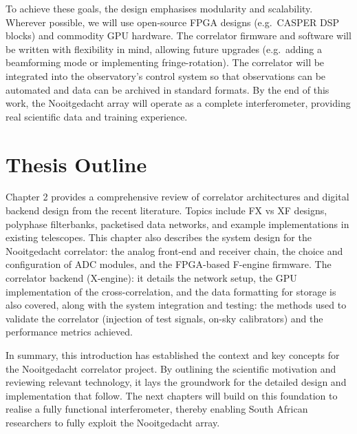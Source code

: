     To achieve these goals, the design emphasises modularity and scalability. Wherever possible, we will use open-source FPGA designs (e.g.\ CASPER DSP blocks) and commodity GPU hardware. The correlator firmware and software will be written with flexibility in mind, allowing future upgrades (e.g.\ adding a beamforming mode or implementing fringe-rotation). The correlator will be integrated into the observatory’s control system so that observations can be automated and data can be archived in standard formats. By the end of this work, the Nooitgedacht array will operate as a complete interferometer, providing real scientific data and training experience.
    
    \section{Thesis Outline}
    Chapter 2 provides a comprehensive review of correlator architectures and digital backend design from the recent literature. Topics include FX vs XF designs, polyphase filterbanks, packetised data networks, and example implementations in existing telescopes. This chapter also describes the system design for the Nooitgedacht correlator: the analog front-end and receiver chain, the choice and configuration of ADC modules, and the FPGA-based F-engine firmware. The correlator backend (X-engine): it details the network setup, the GPU implementation of the cross-correlation, and the data formatting for storage is also covered, along with the system integration and testing: the methods used to validate the correlator (injection of test signals, on-sky calibrators) and the performance metrics achieved.
    
    In summary, this introduction has established the context and key concepts for the Nooitgedacht correlator project. By outlining the scientific motivation and reviewing relevant technology, it lays the groundwork for the detailed design and implementation that follow. The next chapters will build on this foundation to realise a fully functional interferometer, thereby enabling South African researchers to fully exploit the Nooitgedacht array.